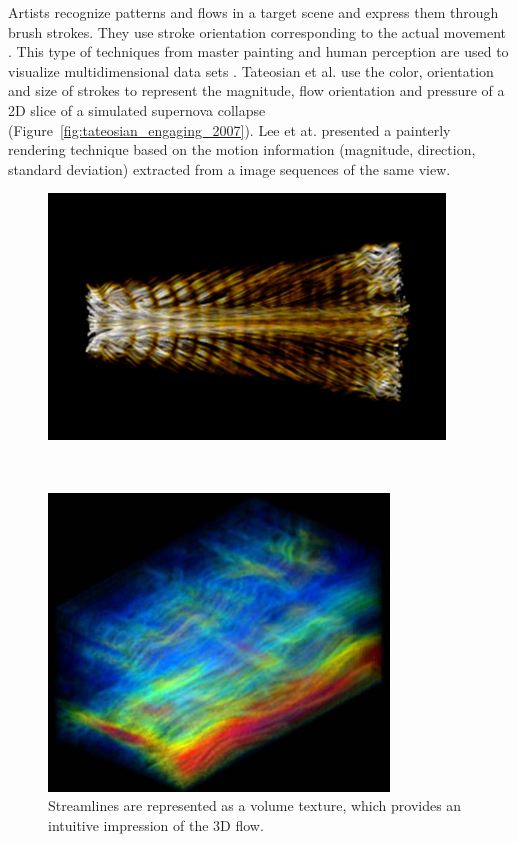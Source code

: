 Artists recognize patterns and flows in a target scene and express them through brush strokes. They use stroke orientation corresponding to the actual movement \cite{lee_motion_2009}. This type of techniques from master painting and human perception are used to visualize multidimensional data sets \cite{healey_perceptually_2004}. Tateosian et al. \cite{tateosian_engaging_2007} use the color, orientation and size of strokes to represent the magnitude, flow orientation and pressure of a 2D slice of a simulated supernova collapse (Figure~\ref{fig:tateosian_engaging_2007}). Lee et at. \cite{lee_motion_2009} presented a painterly rendering technique based on the motion information (magnitude, direction, standard deviation) extracted from a image sequences of the same view.

\begin{figure}
	\centering
	\begin{minipage}{.49\textwidth}
		\centering
		\includegraphics[width=1\linewidth]{images/interrante_strategies_1997.png}
		\caption{Streamlines are represented as a volume texture, which provides an intuitive impression of the 3D flow. \cite{interrante_strategies_1997}}
		\label{fig:interrante_strategies_1997}
	\end{minipage}~
	\begin{minipage}{.49\textwidth}
		\centering
		\includegraphics[width=1\linewidth]{images/liu_texture-based_2005.png}

\end{minipage}
\end{figure}
